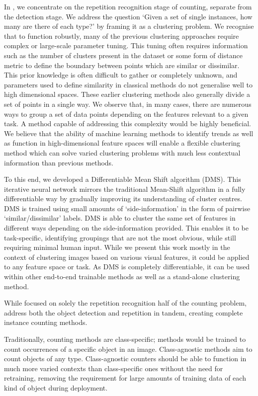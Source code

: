 \documentclass[../thesis.tex]{subfiles}
\begin{document}
In \textbf{}, we concentrate on the repetition recognition stage of counting, separate from the detection stage.
We address the question `Given a set of single instances, how many are there of each type?' by framing it as a clustering problem.
We recognise that to function robustly,  many of the previous clustering approaches require complex or large-scale parameter tuning. 
This tuning often requires information such as the number of clusters present in the dataset or some form of distance metric to define the boundary between points which are similar or dissimilar.
This prior knowledge is often difficult to gather or completely unknown, and parameters used to define similarity in classical methods do not generalise well to high dimensional spaces.
These earlier clustering methods also generally divide a set of points in a single way.
We observe that, in many cases, there are numerous ways to group a set of data points depending on the features relevant to a given task. A method capable of addressing this complexity would be highly beneficial.
We believe that the ability of machine learning methods to identify trends as well as function in high-dimensional feature spaces will enable a flexible clustering method which can solve varied clustering problems with much less contextual information than previous methods.

To this end, we developed a Differentiable Mean Shift algorithm (DMS). This iterative neural network mirrors the traditional Mean-Shift algorithm in a fully differentiable way by gradually improving its understanding of cluster centres. DMS is trained using small amounts of `side-information' in the form of pairwise `similar/dissimilar' labels.
DMS is able to cluster the same set of features in different ways depending on the side-information provided. This enables it to be task-specific, identifying groupings that are not the most obvious, while still requiring minimal human input.
While we present this work mostly in the context of clustering images based on various visual features, it could be applied to any feature space or task.
As DMS is completely differentiable, it can be used within other end-to-end trainable methods as well as a stand-alone clustering method.


While   focused on solely the repetition recognition half of the counting problem,  address both the object detection and repetition in tandem, creating complete instance counting methods.

Traditionally, counting methods are class-specific; methods would be trained to count occurrences of a specific object in an image. Class-agnostic methods aim to count objects of any type. 
Class-agnostic counters should be able to function in much more varied contexts than class-specific ones without the need for retraining, removing the requirement for large amounts of training data of each kind of object during deployment.
\end{document}
